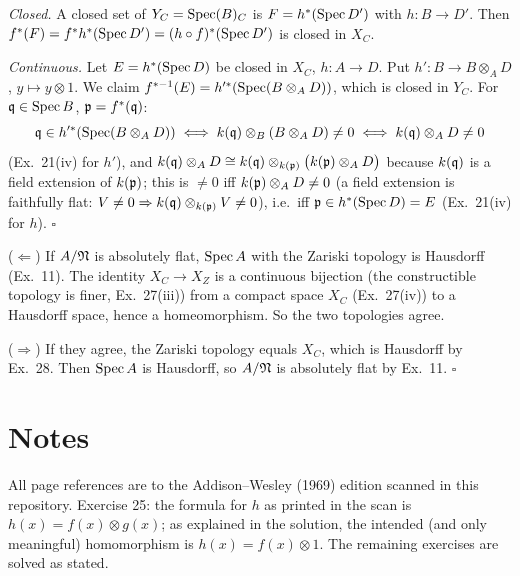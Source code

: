 \documentclass[11pt]{article}
\begin{document}
\pf
\emph{Closed.} A closed set of $Y_C=\operatorname{Spec}(B)_C$ is $F=h^*(\operatorname{Spec} D')$ with $h:B\to D'$. Then $f^*(F)=f^*h^*(\operatorname{Spec} D')=(h\circ f)^*(\operatorname{Spec} D')$ is closed in $X_C$.

\emph{Continuous.} Let $E=h^*(\operatorname{Spec} D)$ be closed in $X_C$, $h:A\to D$. Put $h':B\to B\otimes_AD$, $y\mapsto y\otimes1$. We claim $f^{*-1}(E)=h'^*(\operatorname{Spec}(B\otimes_AD))$, which is closed in $Y_C$. For $\mathfrak q\in\operatorname{Spec} B$, $\mathfrak p=f^*(\mathfrak q)$:
\[
\mathfrak q\in h'^*(\operatorname{Spec}(B\otimes_AD))\iff k(\mathfrak q)\otimes_B(B\otimes_AD)\ne0\iff k(\mathfrak q)\otimes_AD\ne0
\]
(Ex.~21(iv) for $h'$), and
$k(\mathfrak q)\otimes_AD\cong k(\mathfrak q)\otimes_{k(\mathfrak p)}\bigl(k(\mathfrak p)\otimes_AD\bigr)$ because $k(\mathfrak q)$ is a field extension of $k(\mathfrak p)$; this is $\ne0$ iff $k(\mathfrak p)\otimes_AD\ne0$ (a field extension is faithfully flat: $V\ne0\Rightarrow k(\mathfrak q)\otimes_{k(\mathfrak p)}V\ne0$), i.e.\ iff $\mathfrak p\in h^*(\operatorname{Spec} D)=E$ (Ex.~21(iv) for $h$). \hfill$\square$

\pf
($\Leftarrow$) If $A/\mathfrak N$ is absolutely flat, $\operatorname{Spec} A$ with the Zariski topology is Hausdorff (Ex.~11). The identity $X_C\to X_Z$ is a continuous bijection (the constructible topology is finer, Ex.~27(iii)) from a compact space $X_C$ (Ex.~27(iv)) to a Hausdorff space, hence a homeomorphism. So the two topologies agree.

($\Rightarrow$) If they agree, the Zariski topology equals $X_C$, which is Hausdorff by Ex.~28. Then $\operatorname{Spec} A$ is Hausdorff, so $A/\mathfrak N$ is absolutely flat by Ex.~11. \hfill$\square$

\section*{Notes}
All page references are to the Addison--Wesley (1969) edition scanned in this repository. Exercise 25: the formula for $h$ as printed in the scan is $h(x)=f(x)\otimes g(x)$; as explained in the solution, the intended (and only meaningful) homomorphism is $h(x)=f(x)\otimes1$. The remaining exercises are solved as stated.
\end{document}
